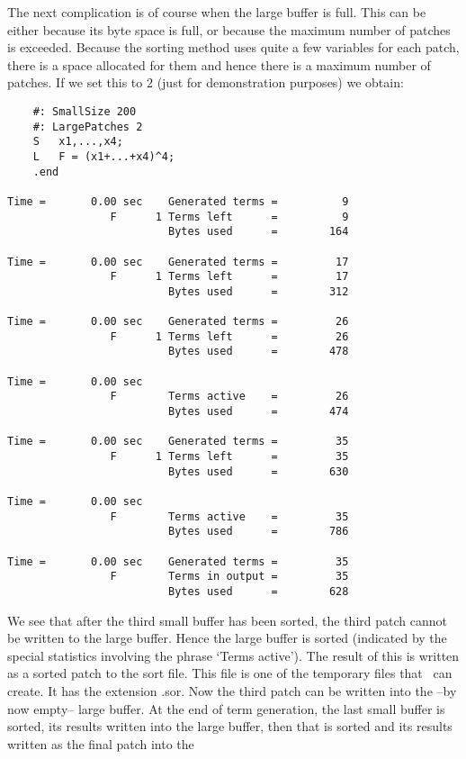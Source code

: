 The next complication is of course when the large buffer is full. This can 
be either because its byte space is full, or because the maximum number of 
patches is exceeded. Because the sorting method uses quite a few variables 
for each patch, there is a space allocated for them and hence there is a 
maximum number of patches. If we set this to 2 (just for demonstration 
purposes) we obtain:
\begin{verbatim}
    #: SmallSize 200
    #: LargePatches 2
    S	x1,...,x4;
    L	F = (x1+...+x4)^4;
    .end

Time =       0.00 sec    Generated terms =          9
                F      1 Terms left      =          9
                         Bytes used      =        164

Time =       0.00 sec    Generated terms =         17
                F      1 Terms left      =         17
                         Bytes used      =        312

Time =       0.00 sec    Generated terms =         26
                F      1 Terms left      =         26
                         Bytes used      =        478

Time =       0.00 sec
                F        Terms active    =         26
                         Bytes used      =        474

Time =       0.00 sec    Generated terms =         35
                F      1 Terms left      =         35
                         Bytes used      =        630

Time =       0.00 sec
                F        Terms active    =         35
                         Bytes used      =        786

Time =       0.00 sec    Generated terms =         35
                F        Terms in output =         35
                         Bytes used      =        628
\end{verbatim}
We see that after the third small buffer has been sorted, the third patch 
cannot be written to the large buffer. Hence the large buffer is sorted 
(indicated by the special statistics involving the phrase `Terms active'). 
The result of this is written as a sorted patch to the
sort file. This file is one of the 
temporary files that \FORM\ can create. It has the 
extension .sor. Now the third patch can be written 
into the --by now empty-- large buffer. At the end of term generation, the 
last small buffer is sorted, its results written into the large buffer, 
then that is sorted and its results written as the final patch into the 
